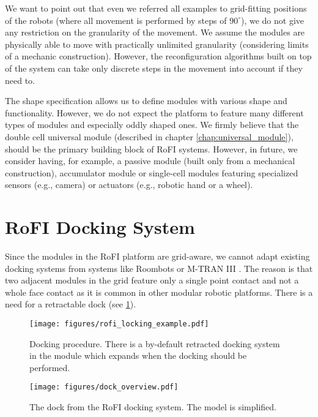 We want to point out that even we referred all examples to grid-fitting
positions of the robots (where all movement is performed by steps of
$90^\circ$), we do not give any restriction on the granularity of the movement.
We assume the modules are physically able to move with practically
unlimited granularity (considering limits of a mechanic construction). However,
the reconfiguration algorithms built on top of the system can take only
discrete steps in the movement into account if they need to.

The shape specification allows us to define modules with various shape and
functionality. However, we do not expect the platform to feature many different
types of modules and especially oddly shaped ones. We firmly believe that the
double cell universal module (described in chapter \ref{chap:universal_module}),
should be the primary building block of RoFI systems. However, in future, we
consider having, for example, a passive module (built only from a mechanical
construction), accumulator module or single-cell modules featuring specialized
sensors (e.g., camera) or actuators (e.g., robotic hand or a wheel).

\section{RoFI Docking System}\label{sec:dock}

Since the modules in the RoFI platform are grid-aware, we cannot adapt existing
docking systems from systems like Roombots \cite{bonardi_locomotion_2012} or
M-TRAN III \cite{kurokawa_distributed_2008}. The reason is that two adjacent
modules in the grid feature only a single point contact and not a whole face
contact as it is common in other modular robotic platforms. There is a need for
a retractable dock (see \ref{fig:rofi_locking_example}).

\begin{figure}[t]
    \centering
    \texttt{[image: figures/rofi\_locking\_example.pdf]}
    \caption{Docking procedure. There is a by-default retracted docking system
    in the module which expands when the docking should be performed.}
    \label{fig:rofi_locking_example}
\end{figure}


\begin{figure}[t]
    \centering
    \texttt{[image: figures/dock\_overview.pdf]}
    \caption{The dock from the RoFI docking system. The model is simplified.}
    \label{fig:dock_overview}
\end{figure}

